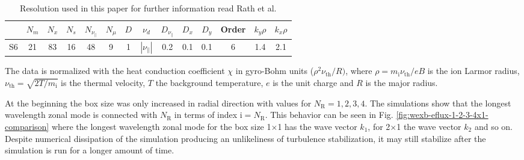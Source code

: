 \documentclass[aip, amsmath, amssymb, reprint, twocolumn]{revtex4-1}
\begin{document}
\begin{table}[ht]
	\begin{ruledtabular}
		\begin{tabular}{l | ccccc | ccccc | c | cc}
			& $N_m$ & $N_x$ & $N_s$ & $N_{\nu_\parallel}$ & $N_\mu$ & $D$ & $\nu_d$           & $D_{\nu_\parallel}$ & $D_x$ & $D_y$ & Order & $k_y\rho$ & $k_x\rho$ \\
			\hline
			S6   & 21    & 83    & 16    & 48                  & 9       & 1   & $|\nu_\parallel|$ & 0.2                 & 0.1   & 0.1   & 6     & 1.4       & 2.1       \\
		\end{tabular}
	\end{ruledtabular}
	\caption{
		Resolution used in this paper for further information read Rath et al. \cite{doi:10.1063/1.4961231} %
	}
	\label{tab:resolution}
\end{table}

The data is normalized with the heat conduction coefficient $\chi$ in gyro-Bohm units ($\rho^2\nu_{\mathrm{th}}/R)$, where $\rho = m_\mathrm{i}\nu_{\mathrm{th}}/eB$ is the ion Larmor radius, $\nu_{\mathrm{th}} = \sqrt{2T/m_\mathrm{i}}$ is the thermal velocity, $T$ the background temperature, $e$ is the unit charge and $R$ is the major radius.



At the beginning the box size was only increased in radial direction with values for $N_\mathrm{R} = 1, 2, 3, 4$. The simulations show that the longest wavelength zonal mode is connected with $N_\mathrm{R}$ in terms of index $\mathrm{i} = N_\mathrm{R}$. This behavior can be seen in Fig. \ref{fig:wexb-eflux-1-2-3-4x1-comparison} where the longest wavelength zonal mode for the box size 1$\times$1 has the wave vector $k_1$, for 2$\times$1 the wave vector $k_2$ and so on. Despite numerical dissipation of the simulation producing an unlikeliness of turbulence stabilization, it may still stabilize after the simulation is run for a longer amount of time. \cite{doi:10.1063/1.4961231}
\end{document}
